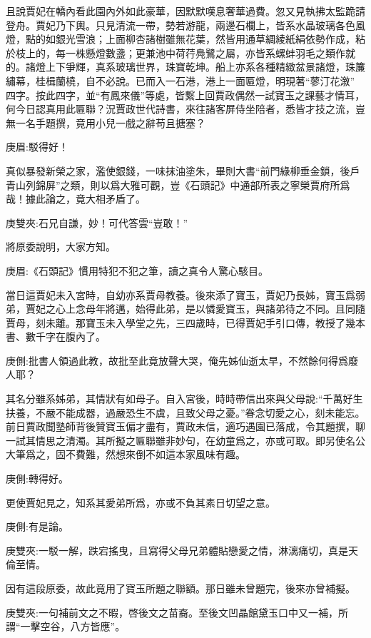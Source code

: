 \begin{parag}
    且說賈妃在轎內看此園內外如此豪華，因默默嘆息奢華過費。忽又見執拂太監跪請登舟。賈妃乃下輿。只見清流一帶，勢若游龍，兩邊石欄上，皆系水晶玻璃各色風燈，點的如銀光雪浪；上面柳杏諸樹雖無花葉，然皆用通草綢綾紙絹依勢作成，粘於枝上的，每一株懸燈數盞；更兼池中荷荇鳧鷺之屬，亦皆系螺蚌羽毛之類作就的。諸燈上下爭輝，真系玻璃世界，珠寶乾坤。船上亦系各種精緻盆景諸燈，珠簾繡幕，桂楫蘭橈，自不必說。已而入一石港，港上一面匾燈，明現著“蓼汀花漵” 四字。按此四字，並“有鳳來儀”等處，皆繫上回賈政偶然一試寶玉之課藝才情耳，何今日認真用此匾聯？況賈政世代詩書，來往諸客屏侍坐陪者，悉皆才技之流，豈無一名手題撰，竟用小兒一戲之辭苟且搪塞？\begin{note}庚眉:駁得好！\end{note}真似暴發新榮之家，濫使銀錢，一味抹油塗朱，畢則大書“前門綠柳垂金鎖，後戶青山列錦屏”之類，則以爲大雅可觀，豈《石頭記》中通部所表之寧榮賈府所爲哉！據此論之，竟大相矛盾了。\begin{note}庚雙夾:石兄自謙，妙！可代答雲“豈敢！”\end{note}將原委說明，大家方知。\begin{note}庚眉:《石頭記》慣用特犯不犯之筆，讀之真令人驚心駭目。\end{note}
\end{parag}


\begin{parag}
    當日這賈妃未入宮時，自幼亦系賈母教養。後來添了寶玉，賈妃乃長姊，寶玉爲弱弟，賈妃之心上念母年將邁，始得此弟，是以憐愛寶玉，與諸弟待之不同。且同隨賈母，刻未離。那寶玉未入學堂之先，三四歲時，已得賈妃手引口傳，教授了幾本書、數千字在腹內了。\begin{note}庚側:批書人領過此教，故批至此竟放聲大哭，俺先姊仙逝太早，不然餘何得爲廢人耶？\end{note}其名分雖系姊弟，其情狀有如母子。自入宮後，時時帶信出來與父母說:“千萬好生扶養，不嚴不能成器，過嚴恐生不虞，且致父母之憂。”眷念切愛之心，刻未能忘。前日賈政聞塾師背後贊寶玉偏才盡有，賈政未信，適巧遇園已落成，令其題撰，聊一試其情思之清濁。其所擬之匾聯雖非妙句，在幼童爲之，亦或可取。即另使名公大筆爲之，固不費難，然想來倒不如這本家風味有趣。\begin{note}庚側:轉得好。\end{note}更使賈妃見之，知系其愛弟所爲，亦或不負其素日切望之意。\begin{note}庚側:有是論。\end{note}\begin{note}庚雙夾:一駁一解，跌宕搖曳，且寫得父母兄弟體貼戀愛之情，淋漓痛切，真是天倫至情。\end{note}因有這段原委，故此竟用了寶玉所題之聯額。那日雖未曾題完，後來亦曾補擬。\begin{note}庚雙夾:一句補前文之不暇，啓後文之苗裔。至後文凹晶館黛玉口中又一補，所謂“一擊空谷，八方皆應”。\end{note}
\end{parag}


